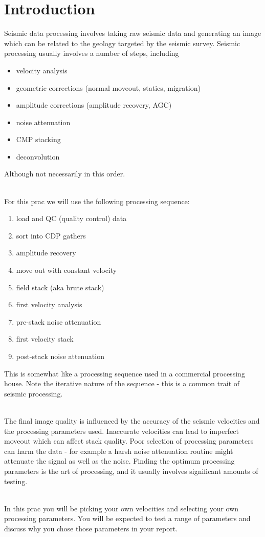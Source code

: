 \section{Introduction}
Seismic data processing involves taking raw seismic data and generating an image which can be related to the geology targeted by the seismic survey.  Seismic processing usually involves a number of steps, including
\begin{itemize}
\item velocity analysis
\item geometric corrections (normal moveout,  statics, migration)
\item amplitude corrections (amplitude recovery, AGC)
\item noise attenuation
\item CMP stacking
\item deconvolution
\end{itemize}
Although not necessarily in this order.
\par~\\
For this prac we will use the following processing sequence:
\begin{enumerate}
\item load and QC (quality control) data
\item sort into CDP gathers
\item amplitude recovery
\item move out with constant velocity
\item field stack (aka brute stack)
\item first velocity analysis
\item pre-stack noise attenuation
\item first velocity stack
\item post-stack noise attenuation
\end{enumerate}
This is somewhat like a processing sequence used in a commercial processing house.  Note the iterative nature of the sequence - this is a common trait of seismic processing.
\par~\\
The final image quality is influenced by the accuracy of the seismic velocities and the processing parameters used.  Inaccurate velocities can lead to imperfect moveout which can affect stack quality.  Poor selection of processing parameters can harm the data - for example a harsh noise attenuation routine might attenuate the signal as well as the noise. Finding the optimum processing parameters is the art of processing, and it usually involves significant amounts of testing.
\par~\\
In this prac you will be picking your own velocities and selecting your own processing parameters.  You will be expected to test a range of parameters and discuss why you chose those parameters in your report.  

